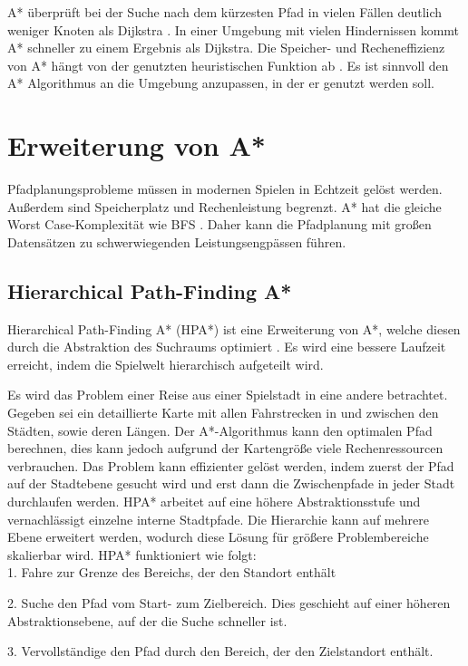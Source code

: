 A* überprüft bei der Suche nach dem kürzesten Pfad in vielen Fällen deutlich weniger Knoten als Dijkstra \cite[S.20f]{Kri09}. In einer Umgebung mit vielen Hindernissen kommt A* schneller zu einem Ergebnis als Dijkstra. Die Speicher- und Recheneffizienz von A* hängt von der genutzten heuristischen Funktion ab \cite[S.237]{Noo15}. Es ist sinnvoll den A* Algorithmus an die Umgebung anzupassen, in der er genutzt werden soll.

\section{Erweiterung von A*}
Pfadplanungsprobleme müssen in modernen Spielen in Echtzeit gelöst werden. Außerdem sind Speicherplatz und Rechenleistung begrenzt. A* hat die gleiche Worst Case-Komplexität wie BFS \cite{You19}. Daher kann die Pfadplanung mit großen Datensätzen zu schwerwiegenden Leistungsengpässen führen.


\subsection{Hierarchical Path-Finding A*}
\label{sec:hpa}
Hierarchical Path-Finding A* (HPA*) ist eine Erweiterung von A*, welche diesen durch die Abstraktion des Suchraums optimiert \cite{Bot04}. Es wird eine bessere Laufzeit erreicht, indem die Spielwelt hierarchisch aufgeteilt wird.

Es wird das Problem einer Reise aus einer Spielstadt in eine andere betrachtet. Gegeben sei ein detaillierte Karte mit allen Fahrstrecken in und zwischen den Städten, sowie deren Längen. Der A*-Algorithmus kann den optimalen Pfad berechnen, dies kann jedoch aufgrund der Kartengröße viele Rechenressourcen verbrauchen. Das Problem kann effizienter gelöst werden, indem zuerst der Pfad auf der Stadtebene gesucht wird und erst dann die Zwischenpfade in jeder Stadt durchlaufen werden. HPA* arbeitet auf eine höhere Abstraktionsstufe und vernachlässigt einzelne interne Stadtpfade. Die Hierarchie kann auf mehrere Ebene erweitert werden, wodurch diese Lösung für größere Problembereiche skalierbar wird. HPA* funktioniert wie folgt:\\

1. Fahre zur Grenze des Bereichs, der den Standort enthält

2. Suche den Pfad vom Start- zum Zielbereich. Dies geschieht auf einer höheren Abstraktionsebene, auf der die Suche schneller ist.

3. Vervollständige den Pfad durch den Bereich, der den Zielstandort enthält.\\

